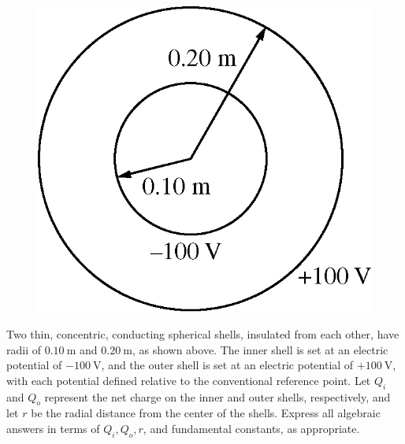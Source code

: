 %
\begin{figure}[h]
\centering
\includegraphics[scale=0.3]{images/img-014-026.png}
\end{figure}


\question
Two thin, concentric, conducting spherical shells, insulated from each other, have radii of $0.10 \mathrm{~m}$ and $0.20 \mathrm{~m}$, as shown above. The inner shell is set at an electric potential of $-100 \mathrm{~V}$, and the outer shell is set at an electric potential of $+100 \mathrm{~V}$, with each potential defined relative to the conventional reference point. Let $Q_{i}$ and $Q_{o}$ represent the net charge on the inner and outer shells, respectively, and let $r$ be the radial distance from the center of the shells. Express all algebraic answers in terms of $Q_{i}, Q_{o}, r$, and fundamental constants, as appropriate.  %

